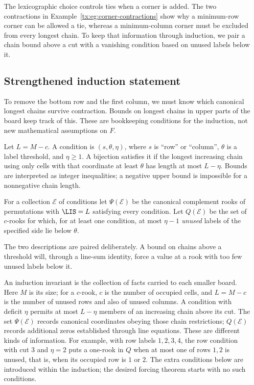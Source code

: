 \documentclass[11pt,a4paper,oneside,openany]{book}
\theoremstyle{definition}\newtheorem{definition}[theorem]{Definition}
\theoremstyle{remark}\newtheorem{remark}[theorem]{Remark}
\numberwithin{equation}{chapter}
\begin{document}
The lexicographic choice controls ties when a corner is added. The two contractions in Example~\ref{tx:eg:corner-contractions} show why a minimum-row corner can be allowed a tie, whereas a minimum-column corner must be excluded from every longest chain. To keep that information through induction, we pair a chain bound above a cut with a vanishing condition based on unused labels below it.

\subsection{Strengthened induction statement}
To remove the bottom row and the first column, we must know which canonical longest chains survive contraction. Bounds on longest chains in upper parts of the board keep track of this. These are bookkeeping conditions for the induction, not new mathematical assumptions on $F$.

Let $L=M-c$. A condition is $(s,\theta,\eta)$, where $s$ is ``row'' or ``column'', $\theta$ is a label threshold, and $\eta\ge1$. A bijection satisfies it if the longest increasing chain using only cells with that coordinate at least $\theta$ has length at most $L-\eta$. Bounds are interpreted as integer inequalities; a negative upper bound is impossible for a nonnegative chain length.

For a collection $\mathcal E$ of conditions let $\Psi(\mathcal E)$ be the canonical complement rooks of permutations with $\LIS=L$ satisfying every condition. Let $Q(\mathcal E)$ be the set of $c$-rooks for which, for at least one condition, at most $\eta-1$ \emph{unused} labels of the specified side lie below $\theta$.

The two descriptions are paired deliberately. A bound on chains above a threshold will, through a line-sum identity, force a value at a rook with too few unused labels below it.

An induction invariant is the collection of facts carried to each
smaller board. Here $M$ is its size; for a $c$-rook, $c$ is the number
of occupied cells, and $L=M-c$ is the number of unused rows and also of unused
columns. A condition with deficit $\eta$ permits at most $L-\eta$
members of an increasing chain above its cut. The set $\Psi(\mathcal E)$
records canonical coordinates obeying those chain restrictions;
$Q(\mathcal E)$ records additional zeros established through line
equations. These are different kinds of information.
For example, with row labels $1,2,3,4$, the row condition with cut
$3$ and $\eta=2$ puts a one-rook in $Q$ when at most one of rows $1,2$
is unused, that is, when its occupied row is $1$ or $2$.
The extra conditions below are introduced within the induction;
the desired forcing theorem starts with no such conditions.
\end{document}
